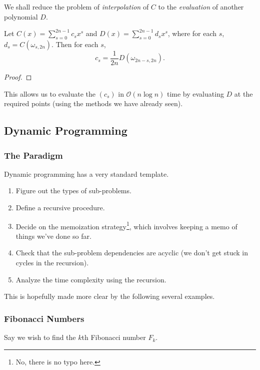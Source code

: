 We shall reduce the problem of \textit{interpolation} of $C$ to the \textit{evaluation} of another polynomial $D$.

\begin{lemma}
	Let $C(x)=\sum_{s=0}^{2n-1} c_s x^s$ and $D(x)=\sum_{s=0}^{2n-1} d_s x^s$, where for each $s$, $d_s = C(\omega_{s,2n})$. Then for each $s$,
	\[ c_s = \frac{1}{2n} D(\omega_{2n-s,2n}). \]
\end{lemma}
\begin{proof}

\end{proof}

This allows us to evaluate the $(c_s)$ in $\mathcal{O}(n\log n)$ time by evaluating $D$ at the required points (using the methods we have already seen).

\subsection{Dynamic Programming}

\subsubsection{The Paradigm}

Dynamic programming has a very standard template.

\begin{enumerate}
	\item Figure out the types of sub-problems.
	\item Define a recursive procedure.
	\item Decide on the memoization strategy\footnote{No, there is no typo here.}, which involves keeping a memo of things we've done so far.
	\item Check that the sub-problem dependencies are acyclic (we don't get stuck in cycles in the recursion).
	\item Analyze the time complexity using the recursion.
\end{enumerate}

This is hopefully made more clear by the following several examples.

\subsubsection{Fibonacci Numbers}

Say we wish to find the $k$th Fibonacci number $F_k$.\\

